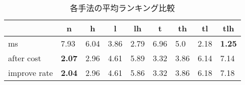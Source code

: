 \begin{table}[htbp]
    \caption{各手法の平均ランキング比較}
    \begin{tabular}{|l|l|l|l|l|l|l|l|l|}\hline
    \multicolumn{1}{|c|}{}
    &\multicolumn{1}{|c|}{\textbf{n}}
    &\multicolumn{1}{|c|}{\textbf{h}}
    &\multicolumn{1}{|c|}{\textbf{l}}
    &\multicolumn{1}{|c|}{\textbf{lh}}
    &\multicolumn{1}{|c|}{\textbf{t}}
    &\multicolumn{1}{|c|}{\textbf{th}}
    &\multicolumn{1}{|c|}{\textbf{tl}}
    &\multicolumn{1}{|c|}{\textbf{tlh}}\\\hline
	ms &7.93 &6.04 &3.86 &2.79 &6.96 &5.0 &2.18 &\textbf{1.25}\\\hline
	after cost &\textbf{2.07} &2.96 &4.61 &5.89 &3.32 &3.86 &6.14 &7.14\\\hline
	improve rate &\textbf{2.04} &2.96 &4.61 &5.86 &3.32 &3.86 &6.18 &7.18\\\hline
	\end{tabular}
\end{table}
